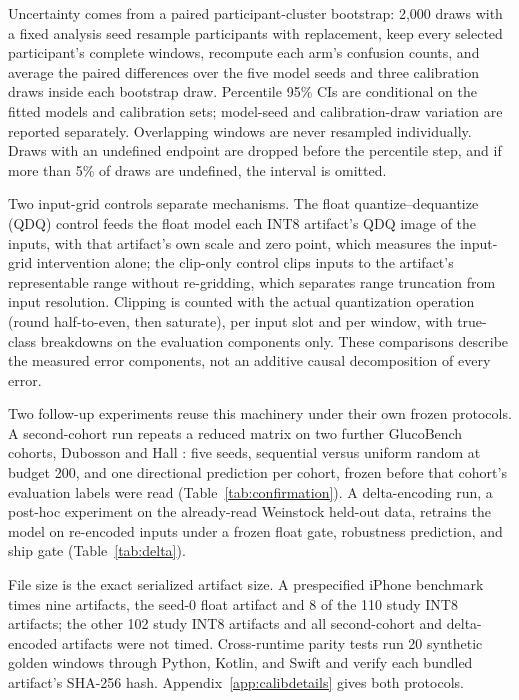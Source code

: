 \documentclass[10pt,twocolumn]{article}
\begin{document}
Uncertainty comes from a paired participant-cluster bootstrap: 2,000 draws
with a fixed analysis seed resample participants with replacement, keep
every selected participant's complete windows, recompute each arm's
confusion counts, and average the paired differences over the five model
seeds and three calibration draws inside each bootstrap draw. Percentile
95\% CIs are conditional on the fitted models and calibration sets;
model-seed and calibration-draw variation are reported separately.
Overlapping windows are never resampled individually. Draws with an
undefined endpoint are dropped before the percentile step, and if more
than 5\% of draws are undefined, the interval is omitted.

Two input-grid controls separate mechanisms. The float quantize--dequantize
(QDQ) control feeds the float model each INT8 artifact's QDQ image of the
inputs, with that artifact's own scale and zero point, which measures the
input-grid intervention alone; the clip-only control clips inputs to the
artifact's representable range without re-gridding, which separates range
truncation from input resolution. Clipping is counted with the actual
quantization operation (round half-to-even, then saturate), per input slot
and per window, with true-class breakdowns on the evaluation components
only. These comparisons describe the measured error components, not an
additive causal decomposition of every error.

Two follow-up experiments reuse this machinery under their own frozen
protocols. A second-cohort run repeats a reduced matrix on two further
GlucoBench cohorts, Dubosson \cite{dubosson2018d1namo} and Hall
\cite{hall2018glucotypes}: five seeds, sequential versus uniform random at
budget 200, and one directional prediction per cohort, frozen before that
cohort's evaluation labels were read (Table~\ref{tab:confirmation}). A
delta-encoding run, a post-hoc experiment on the already-read Weinstock
held-out data, retrains the model on re-encoded inputs under a frozen float
gate, robustness prediction, and ship gate (Table~\ref{tab:delta}).

File size is the exact serialized artifact size. A prespecified iPhone
benchmark times nine artifacts, the seed-0 float artifact and 8 of the 110
study INT8 artifacts; the other 102 study INT8 artifacts and all
second-cohort and delta-encoded artifacts were not timed. Cross-runtime
parity tests run 20 synthetic golden windows through Python, Kotlin, and
Swift and verify each bundled artifact's SHA-256 hash.
Appendix~\ref{app:calibdetails} gives both protocols.
\end{document}
